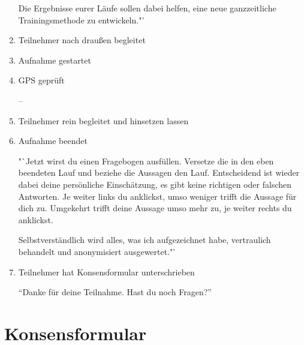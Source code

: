 \begin{enumerate}
	Die Ergebnisse eurer Läufe sollen dabei helfen, eine neue ganzzeitliche Trainingsmethode zu entwickeln."'
	
	\item Teilnehmer nach draußen begleitet 
	\item Aufnahme gestartet 
	\item \acs{GPS} geprüft
	
	--
	
	\item Teilnehmer rein begleitet und hinsetzen lassen 
	\item Aufnahme beendet
	
	"`Jetzt wirst du einen Fragebogen ausfüllen. Versetze die in den eben beendeten Lauf und beziehe die Aussagen den Lauf. Entscheidend ist wieder dabei deine persönliche Einschätzung, es gibt keine richtigen oder falschen Antworten. Je weiter links du anklickst, umso weniger trifft die Aussage für dich zu. Umgekehrt trifft deine Aussage umso mehr zu, je weiter rechts du anklickst.
	
	Selbstverständlich wird alles, was ich aufgezeichnet habe, vertraulich behandelt und anonymisiert ausgewertet."'
	
	\item Teilnehmer hat Konsensformular unterschrieben
	
	"`Danke für deine Teilnahme. Hast du noch Fragen?"' 
\end{enumerate}
\newpage

\section{Konsensformular} 

\label{sec:konsensformular}

